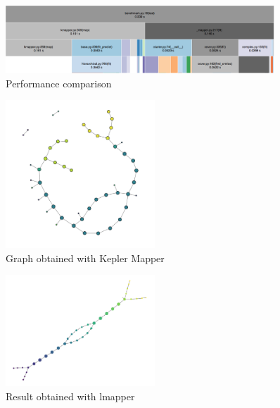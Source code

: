 \begin{figure}[h]
	\caption{Performance comparison}
	\centering
	\includegraphics[width=0.9\textwidth]{images/benchmark/synthetic/benchmark}
\end{figure}
\begin{figure}[h]
	\caption{Graph obtained with Kepler Mapper}
	\centering
	\includegraphics[width=0.5\textwidth]{images/benchmark/synthetic/benchmark_kmapper}
\end{figure}
\begin{figure}[h]
	\caption{Result obtained with lmapper}
	\centering
	\includegraphics[width=0.5\textwidth]{images/benchmark/synthetic/benchmark_lmapper}
\end{figure}

